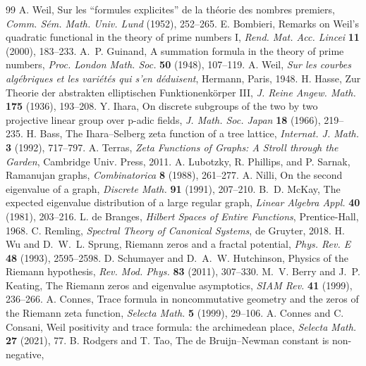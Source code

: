 \documentclass[11pt]{article}
\theoremstyle{remark}
\begin{document}
\begin{thebibliography}{99}
 A. Weil, Sur les ``formules explicites'' de la th\'eorie des nombres premiers,
\emph{Comm. S\'em. Math. Univ. Lund} (1952), 252--265.
 E. Bombieri, Remarks on Weil's quadratic functional in the theory of prime
numbers I, \emph{Rend. Mat. Acc. Lincei} \textbf{11} (2000), 183--233.
 A.~P. Guinand, A summation formula in the theory of prime numbers,
\emph{Proc. London Math. Soc.} \textbf{50} (1948), 107--119.
 A. Weil, \emph{Sur les courbes alg\'ebriques et les vari\'et\'es qui s'en
d\'eduisent}, Hermann, Paris, 1948.
 H. Hasse, Zur Theorie der abstrakten elliptischen Funktionenk\"orper III,
\emph{J. Reine Angew. Math.} \textbf{175} (1936), 193--208.
 Y. Ihara, On discrete subgroups of the two by two projective linear group over
p-adic fields, \emph{J. Math. Soc. Japan} \textbf{18} (1966), 219--235.
 H. Bass, The Ihara--Selberg zeta function of a tree lattice, \emph{Internat. J.
Math.} \textbf{3} (1992), 717--797.
 A. Terras, \emph{Zeta Functions of Graphs: A Stroll through the Garden}, Cambridge
Univ. Press, 2011.
 A. Lubotzky, R. Phillips, and P. Sarnak, Ramanujan graphs, \emph{Combinatorica}
\textbf{8} (1988), 261--277.
 A. Nilli, On the second eigenvalue of a graph, \emph{Discrete Math.} \textbf{91}
(1991), 207--210.
 B.~D. McKay, The expected eigenvalue distribution of a large regular graph,
\emph{Linear Algebra Appl.} \textbf{40} (1981), 203--216.
 L. de Branges, \emph{Hilbert Spaces of Entire Functions}, Prentice-Hall, 1968.
 C. Remling, \emph{Spectral Theory of Canonical Systems}, de Gruyter, 2018.
 H. Wu and D.~W.~L. Sprung, Riemann zeros and a fractal potential, \emph{Phys.
Rev. E} \textbf{48} (1993), 2595--2598.
 D. Schumayer and D.~A.~W. Hutchinson, Physics of the Riemann hypothesis,
\emph{Rev. Mod. Phys.} \textbf{83} (2011), 307--330.
 M.~V. Berry and J.~P. Keating, The Riemann zeros and eigenvalue asymptotics,
\emph{SIAM Rev.} \textbf{41} (1999), 236--266.
 A. Connes, Trace formula in noncommutative geometry and the zeros of the Riemann
zeta function, \emph{Selecta Math.} \textbf{5} (1999), 29--106.
 A. Connes and C. Consani, Weil positivity and trace formula: the
archimedean place, \emph{Selecta Math.} \textbf{27} (2021), 77.
 B. Rodgers and T. Tao, The de Bruijn--Newman constant is non-negative,

\end{thebibliography}
\end{document}
